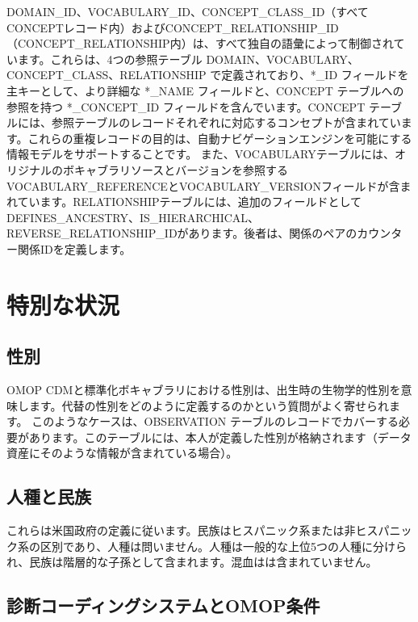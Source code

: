 \documentclass[
  11pt]{book}
\theoremstyle{definition}
\theoremstyle{definition}
\theoremstyle{definition}
\theoremstyle{definition}
\theoremstyle{remark}
\begin{document}
DOMAIN\_ID、VOCABULARY\_ID、CONCEPT\_CLASS\_ID（すべてCONCEPTレコード内）およびCONCEPT\_RELATIONSHIP\_ID（CONCEPT\_RELATIONSHIP内）は、すべて独自の語彙によって制御されています。これらは、4つの参照テーブル DOMAIN、VOCABULARY、CONCEPT\_CLASS、RELATIONSHIP で定義されており、*\_ID フィールドを主キーとして、より詳細な *\_NAME フィールドと、CONCEPT テーブルへの参照を持つ *\_CONCEPT\_ID フィールドを含んでいます。CONCEPT テーブルには、参照テーブルのレコードそれぞれに対応するコンセプトが含まれています。これらの重複レコードの目的は、自動ナビゲーションエンジンを可能にする情報モデルをサポートすることです。 また、VOCABULARYテーブルには、オリジナルのボキャブラリソースとバージョンを参照するVOCABULARY\_REFERENCEとVOCABULARY\_VERSIONフィールドが含まれています。RELATIONSHIPテーブルには、追加のフィールドとしてDEFINES\_ANCESTRY、IS\_HIERARCHICAL、REVERSE\_RELATIONSHIP\_IDがあります。後者は、関係のペアのカウンター関係IDを定義します。

\section{特別な状況}\label{specialSituations}

\subsection{性別}\label{ux6027ux5225}

OMOP CDMと標準化ボキャブラリにおける性別は、出生時の生物学的性別を意味します。代替の性別をどのように定義するのかという質問がよく寄せられます。 このようなケースは、OBSERVATION テーブルのレコードでカバーする必要があります。このテーブルには、本人が定義した性別が格納されます（データ資産にそのような情報が含まれている場合）。

\subsection{人種と民族}\label{ux4ebaux7a2eux3068ux6c11ux65cf}

これらは米国政府の定義に従います。民族はヒスパニック系または非ヒスパニック系の区別であり、人種は問いません。人種は一般的な上位5つの人種に分けられ、民族は階層的な子孫として含まれます。混血はは含まれていません。

\subsection{診断コーディングシステムとOMOP条件}\label{ux8a3aux65adux30b3ux30fcux30c7ux30a3ux30f3ux30b0ux30b7ux30b9ux30c6ux30e0ux3068omopux6761ux4ef6}
\end{document}
